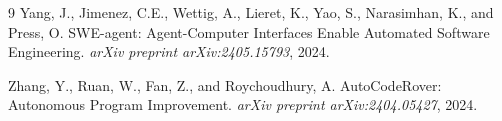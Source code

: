 \documentclass[11pt]{article}
\begin{document}

\begin{thebibliography}{9}
Yang, J., Jimenez, C.E., Wettig, A., Lieret, K., Yao, S., Narasimhan, K., and Press, O.
\newblock SWE-agent: Agent-Computer Interfaces Enable Automated Software Engineering.
\newblock \emph{arXiv preprint arXiv:2405.15793}, 2024.

Zhang, Y., Ruan, W., Fan, Z., and Roychoudhury, A.
\newblock AutoCodeRover: Autonomous Program Improvement.
\newblock \emph{arXiv preprint arXiv:2404.05427}, 2024.
\end{thebibliography}
\end{document}
